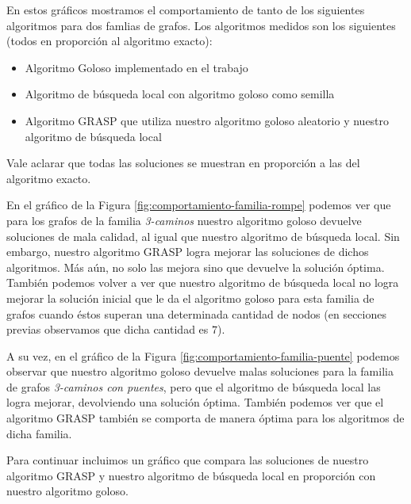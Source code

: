 En estos gráficos mostramos el comportamiento de tanto de los siguientes algoritmos para dos famlias de grafos. Los algoritmos medidos son los siguientes (todos en proporción al algoritmo exacto):

\begin{itemize}
 \item Algoritmo Goloso implementado en el trabajo
 \item Algoritmo de búsqueda local con algoritmo goloso como semilla
 \item Algoritmo GRASP que utiliza nuestro algoritmo goloso aleatorio y nuestro algoritmo de búsqueda local
\end{itemize}

Vale aclarar que todas las soluciones se muestran en proporción a las del algoritmo exacto.

En el gráfico de la Figura \ref{fig:comportamiento-familia-rompe} podemos ver que para los grafos de la familia \emph{3-caminos} nuestro algoritmo goloso devuelve soluciones de mala calidad, al igual que nuestro algoritmo de búsqueda local. Sin embargo, nuestro algoritmo GRASP logra mejorar las soluciones de dichos algoritmos. Más aún, no solo las mejora sino que devuelve la solución óptima. También podemos volver a ver que nuestro algoritmo de búsqueda local no logra mejorar la solución inicial que le da el algoritmo goloso para esta familia de grafos cuando éstos superan una determinada cantidad de nodos (en secciones previas observamos que dicha cantidad es $7$).

A su vez, en el gráfico de la Figura \ref{fig:comportamiento-familia-puente} podemos observar que nuestro algoritmo goloso devuelve malas soluciones para la familia de grafos \emph{3-caminos con puentes}, pero que el algoritmo de búsqueda local las logra mejorar, devolviendo una solución óptima. También podemos ver que el algoritmo GRASP también se comporta de manera óptima para los algoritmos de dicha familia.

Para continuar incluimos un gráfico que compara las soluciones de nuestro algoritmo GRASP y nuestro algoritmo de búsqueda local en proporción con nuestro algoritmo goloso.

